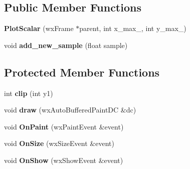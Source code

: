 \subsection*{Public Member Functions}
\begin{DoxyCompactItemize}
\item 
\hypertarget{class_plot_scalar_a53c9d8fbf1e4420dd1fc27910fb02403}{{\bfseries Plot\-Scalar} (wx\-Frame $\ast$parent, int x\-\_\-max\-\_\-, int y\-\_\-max\-\_\-)}\label{class_plot_scalar_a53c9d8fbf1e4420dd1fc27910fb02403}

\item 
\hypertarget{class_plot_scalar_a0d910560ef24c40c5aab8540c6dd82c2}{void {\bfseries add\-\_\-new\-\_\-sample} (float sample)}\label{class_plot_scalar_a0d910560ef24c40c5aab8540c6dd82c2}

\end{DoxyCompactItemize}
\subsection*{Protected Member Functions}
\begin{DoxyCompactItemize}
\item 
\hypertarget{class_plot_scalar_ad2c5214849ba51b85c61e5ed1949b28e}{int {\bfseries clip} (int y1)}\label{class_plot_scalar_ad2c5214849ba51b85c61e5ed1949b28e}

\item 
\hypertarget{class_plot_scalar_aa901215be79b5a522c416224c6554cf3}{void {\bfseries draw} (wx\-Auto\-Buffered\-Paint\-D\-C \&dc)}\label{class_plot_scalar_aa901215be79b5a522c416224c6554cf3}

\item 
\hypertarget{class_plot_scalar_a8e31e0b1a2415d7bdf8a4c521dbc2e8d}{void {\bfseries On\-Paint} (wx\-Paint\-Event \&event)}\label{class_plot_scalar_a8e31e0b1a2415d7bdf8a4c521dbc2e8d}

\item 
\hypertarget{class_plot_scalar_a6b41cd9d409567b395f539d0204c706c}{void {\bfseries On\-Size} (wx\-Size\-Event \&event)}\label{class_plot_scalar_a6b41cd9d409567b395f539d0204c706c}

\item 
\hypertarget{class_plot_scalar_acb95980f2589a99431b5e358c98a91f2}{void {\bfseries On\-Show} (wx\-Show\-Event \&event)}\label{class_plot_scalar_acb95980f2589a99431b5e358c98a91f2}

\end{DoxyCompactItemize}
